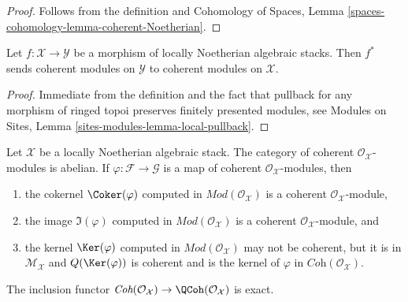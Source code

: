 \begin{proof}
Follows from the definition and
Cohomology of Spaces, Lemma
\ref{spaces-cohomology-lemma-coherent-Noetherian}.
\end{proof}

\begin{lemma}
\label{lemma-pullback-coherent}
Let $f : \mathcal{X} \to \mathcal{Y}$ be a morphism of locally
Noetherian algebraic stacks. Then $f^*$ sends coherent modules
on $\mathcal{Y}$ to coherent modules on $\mathcal{X}$.
\end{lemma}

\begin{proof}
Immediate from the definition and the fact that pullback for any morphism
of ringed topoi preserves finitely presented modules, see
Modules on Sites, Lemma \ref{sites-modules-lemma-local-pullback}.
\end{proof}

\begin{lemma}
\label{lemma-coherent-abelian-Noetherian}
Let $\mathcal{X}$ be a locally Noetherian algebraic stack.
The category of coherent $\mathcal{O}_\mathcal{X}$-modules is abelian.
If $\varphi : \mathcal{F} \to \mathcal{G}$ is a map
of coherent $\mathcal{O}_\mathcal{X}$-modules, then
\begin{enumerate}
\item the cokernel $\Coker(\varphi)$ computed in
$\textit{Mod}(\mathcal{O}_\mathcal{X})$ is a coherent
$\mathcal{O}_\mathcal{X}$-module,
\item the image $\Im(\varphi)$ computed in
$\textit{Mod}(\mathcal{O}_\mathcal{X})$ is a coherent
$\mathcal{O}_\mathcal{X}$-module, and
\item the kernel $\Ker(\varphi)$ computed in
$\textit{Mod}(\mathcal{O}_\mathcal{X})$
may not be coherent, but it is
in $\mathcal{M}_\mathcal{X}$ and $Q(\Ker(\varphi))$
is coherent and is the kernel of $\varphi$ in
$\textit{Coh}(\mathcal{O}_\mathcal{X})$.
\end{enumerate}
The inclusion functor $\textit{Coh}(\mathcal{O}_\mathcal{X}) \to
\QCoh(\mathcal{O}_\mathcal{X})$ is exact.
\end{lemma}

